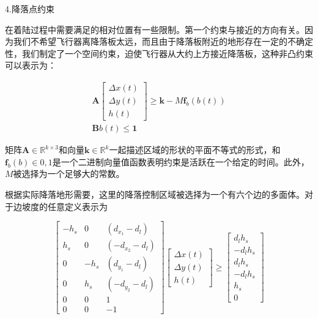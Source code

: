 4.降落点约束

在着陆过程中需要满足的相对位置有一些限制。第一个约束与接近的方向有关。因为我们不希望飞行器离降落板太远，而且由于降落板附近的地形存在一定的不确定性，我们制定了一个空间约束，迫使飞行器从大约上方接近降落板，这种非凸约束可以表示为：

\begin{equation}
\begin{array}{r}
\boldsymbol{A}\left[\begin{array}{c}
\Delta x(t) \\
\Delta y(t) \\
h(t)
\end{array}\right] \geq \boldsymbol{k}-M \boldsymbol{f}_{b}(b(t)) \\
\boldsymbol{B} b(t) \leq \mathbf{1}
\end{array}
\end{equation}

矩阵$\boldsymbol{A} \in \mathbb{R}^{k \times 3}$和向量$\boldsymbol{k} \in \mathbb{R}^{k}$一起描述区域的形状的平面不等式的形式，和$\boldsymbol{f}_{b}(b) \in {0,1}$是一个二进制向量值函数表明约束是活跃在一个给定的时间。此外，$M$被选择为一个足够大的常数。

根据实际降落地形需要，这里的降落控制区域被选择为一个有六个边的多面体。对于边坡度的任意定义表示为

\begin{equation}
\left[\begin{array}{ccc}
-h_{s} & 0 & \left(d_{x_{1}}-d_{l}\right) \\
h_{s} & 0 & \left(-d_{x_{2}}-d_{l}\right) \\
0 & -h_{s} & \left(d_{y_{1}}-d_{l}\right) \\
0 & h_{s} & \left(-d_{y_{2}}-d_{l}\right) \\
0 & 0 & 1 \\
0 & 0 & -1
\end{array}\right]\left[\begin{array}{c}
\Delta x(t) \\
\Delta y(t) \\
h(t)
\end{array}\right] \geq\left[\begin{array}{c}
d_{l} h_{s} \\
-d_{l} h_{s} \\
d_{l} h_{s} \\
-d_{l} h_{s} \\
h_{s} \\
0
\end{array}\right]
\end{equation}

